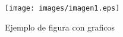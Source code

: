 \begin{figure}[!th]
\begin{center}
\texttt{[image: images/imagen1.eps]}
\caption{Ejemplo de figura con graficos}
\label{fig}
\end{center}
\end{figure}